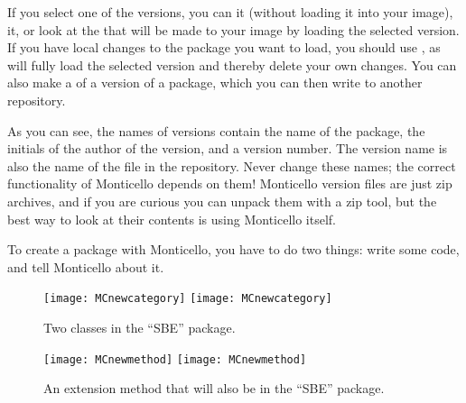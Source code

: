 \documentclass[a4paper,10pt,twoside]{book}
\begin{document}
If you select one of the versions, you can  it (without loading it into your image),  it, or look at the  that will be made to your image by loading the selected version.
If you have local changes to the package you want to load, you should use , as  will fully load the selected version and thereby delete your own changes.
You can also make a  of a version of a package, which you can then write to another repository.

As you can see, the names of versions contain the name of the package, the initials of the author of the version, and a version number.
The version name is also the name of the file in the repository.
Never change these names; the correct functionality of Monticello depends on them!
Monticello version files are just zip archives, and if you are curious you can unpack them with a zip tool, but the best way to look at their contents is using Monticello itself.

To create a package with Monticello, you have to do two things: write some code, and tell Monticello about it.


\begin{figure}[btp]
	\begin{center}
	\ifluluelse
		{\texttt{[image: MCnewcategory]}}
		{\texttt{[image: MCnewcategory]}}
	\end{center}
	\caption{Two classes in the ``SBE'' package.}
	\label{fig:MCnewcategory}
\end{figure}

\begin{figure}[btp]
	\begin{center}
	\ifluluelse
		{\texttt{[image: MCnewmethod]}}
		{\texttt{[image: MCnewmethod]}}
	\end{center}
	\caption{An extension method that will also be in the ``SBE'' package.}
	\label{fig:MCnewmethod}
\end{figure}
\end{document}
